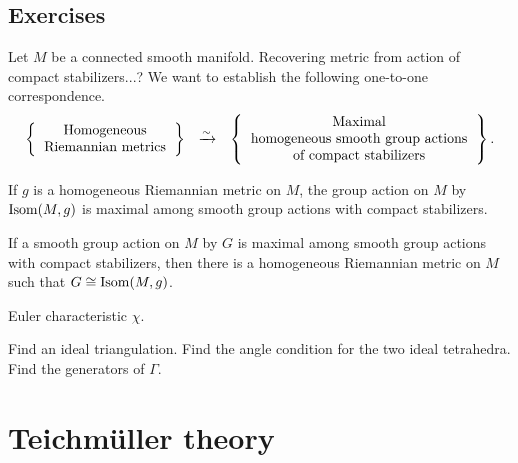 \documentclass{../../large}
\begin{document}
\section*{Exercises}

\begin{prb}
Let $M$ be a connected smooth manifold.
Recovering metric from action of compact stabilizers...?
We want to establish the following one-to-one correspondence.
\[\begin{array}{ccc}
\left\{\begin{tabular}{c}Homogeneous\\Riemannian metrics\end{tabular}\right\}
&\xrightarrow{\sim}&
\left\{\begin{tabular}{c}Maximal\\homogeneous smooth group actions\\of compact stabilizers\end{tabular}\right\}.
\end{array}\]
\begin{parts}
\item If $g$ is a homogeneous Riemannian metric on $M$, the group action on $M$ by $\operatorname{Isom}(M,g)$ is maximal among smooth group actions with compact stabilizers.
\item If a smooth group action on $M$ by $G$ is maximal among smooth group actions with compact stabilizers, then there is a homogeneous Riemannian metric on $M$ such that $G\cong\operatorname{Isom}(M,g)$.
\end{parts}
\end{prb}
\begin{pf}
\end{pf}

\begin{prb}
Euler characteristic $\chi$.
\end{prb}
\begin{prb}
Find an ideal triangulation.
Find the angle condition for the two ideal tetrahedra.
Find the generators of $\Gamma$.
\end{prb}
\begin{prb}
\end{prb}
\begin{prb}
\end{prb}


\chapter{Teichm\"uller theory}
\end{document}
